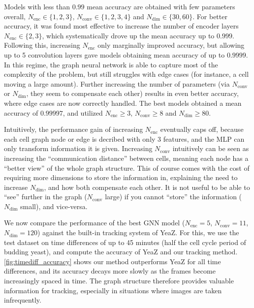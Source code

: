 \documentclass[10pt,conference,compsocconf,a4paper]{IEEEtran}
\newcommand*{\shortautoref}[1]{%
	\begingroup
	\def\equationautorefname{\textsc{Eq.}}%
	\def\tableautorefname{\textsc{Tab.}}%
	\def\figureautorefname{\textsc{Fig.}}%
	\autoref{#1}%
	\endgroup
}
\begin{document}
		Models with less than $0.99$ mean accuracy are obtained with few parameters overall, $N_\textrm{enc} \in \{1,2,3\}$, $N_\textrm{conv} \in \{1,2,3,4\}$ and $N_\textrm{dim} \in \{30, 60\}$. For better accuracy, it was found most effective to increase the number of encoder layers $N_\textrm{enc} \in \{2,3\}$, which systematically drove up the mean accuracy up to $0.999$. Following this, increasing $N_\textrm{enc}$ only marginally improved accuracy, but allowing up to 5 convolution layers gave models obtaining mean accuracy of up to $0.9999$. In this regime, the graph neural network is able to capture most of the complexity of the problem, but still struggles with edge cases (for instance, a cell moving a large amount). Further increasing the number of parameters (via $N_\textrm{conv}$ or $N_\textrm{dim}$, they seem to compensate each other) results in even better accuracy, where edge cases are now correctly handled. The best models obtained a mean accuracy of $0.99997$, and utilized $N_\textrm{enc} \geq 3$, $N_\textrm{conv} \geq 8$ and $N_\textrm{dim} \geq 80$.

		Intuitively, the performance gain of increasing $N_\textrm{enc}$ eventually caps off, because each cell graph node or edge is decribed with only 3 features, and the MLP can only transform information it is given. Increasing $N_\textrm{conv}$ intuitively can be seen as increasing the ``communication distance'' between cells, meaning each node has a ``better view'' of the whole graph structure. This of course comes with the cost of requiring more dimensions to store the information in, explaining the need to increase $N_\textrm{dim}$, and how both compensate each other. It is not useful to be able to ``see'' further in the graph ($N_\textrm{conv}$ large) if you cannot ``store'' the information ($N_\textrm{dim}$ small), and vice-versa.

		We now compare the performance of the best GNN model ($N_\textrm{enc}=5$, $N_\textrm{conv}=11$, $N_\textrm{dim}=120$) against the built-in tracking system of YeaZ. For this, we use the test dataset on time differences of up to 45 minutes (half the cell cycle period of budding yeast), and compute the accuracy of YeaZ and our tracking method. \shortautoref{fig:timediff_accuracy} shows our method outperforms YeaZ for all time differences, and its accuracy decays more slowly as the frames become increasingly spaced in time. The graph structure therefore provides valuable information for tracking, especially in situations where images are taken infrequently.
\end{document}
